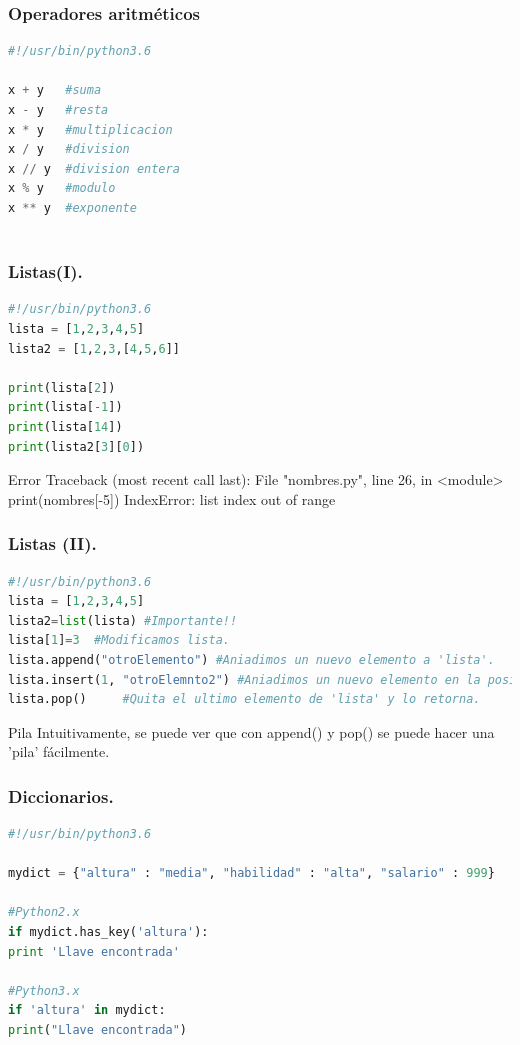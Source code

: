 \documentclass{beamer}
\begin{document}
\begin{frame}[fragile]
\frametitle{Operadores aritméticos}
\begin{lstlisting}[language=Python]
#!/usr/bin/python3.6

x + y	#suma
x - y	#resta
x * y	#multiplicacion
x / y	#division
x // y	#division entera
x % y	#modulo
x ** y	#exponente



\end{lstlisting}
\end{frame}

\begin{frame}[fragile]
\frametitle{Listas(I).}
\begin{lstlisting}[language=Python]
#!/usr/bin/python3.6
lista = [1,2,3,4,5]
lista2 = [1,2,3,[4,5,6]]

print(lista[2])
print(lista[-1])
print(lista[14])
print(lista2[3][0])

\end{lstlisting} \pause
\begin{block}{Error}
Traceback (most recent call last):
File "nombres.py", line 26, in <module>
print(nombres[-5])
IndexError: list index out of range
\end{block}
\end{frame}

\begin{frame}[fragile]
\frametitle{Listas (II).}
\begin{lstlisting}[language=Python]
#!/usr/bin/python3.6
lista = [1,2,3,4,5]
lista2=list(lista) #Importante!!
lista[1]=3 	#Modificamos lista.
lista.append("otroElemento") #Aniadimos un nuevo elemento a 'lista'. 
lista.insert(1, "otroElemnto2") #Aniadimos un nuevo elemento en la posicion 1.
lista.pop() 	#Quita el ultimo elemento de 'lista' y lo retorna.
\end{lstlisting} \pause
\begin{block}{Pila}
Intuitivamente, se puede ver que con append() y pop() se puede hacer una 'pila' fácilmente.
\end{block}
\end{frame}

\begin{frame}[fragile]
\frametitle{Diccionarios.}
\begin{lstlisting}[language=Python]
#!/usr/bin/python3.6

mydict = {"altura" : "media", "habilidad" : "alta", "salario" : 999}

#Python2.x
if mydict.has_key('altura'):
print 'Llave encontrada'

#Python3.x
if 'altura' in mydict:
print("Llave encontrada")
\end{lstlisting}
\end{frame}
\end{document}
